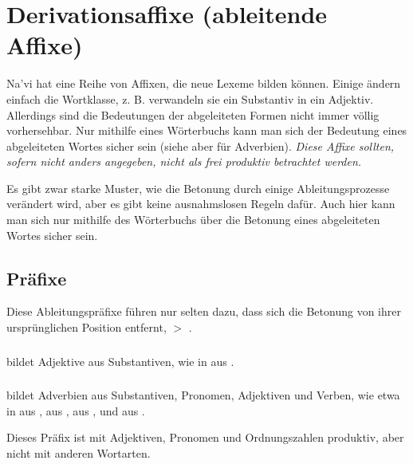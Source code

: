 
\section{Derivationsaffixe (ableitende Affixe)}\label{lingop:affixes}
\noindent Na'vi hat eine Reihe von Affixen, die neue Lexeme bilden können. Einige ändern einfach die Wortklasse, z. B. verwandeln sie ein Substantiv in ein Adjektiv. Allerdings sind die Bedeutungen der abgeleiteten Formen nicht immer völlig vorhersehbar. Nur mithilfe eines Wörterbuchs kann man sich der Bedeutung eines abgeleiteten Wortes sicher sein (siehe aber  für Adverbien). \textit{Diese Affixe sollten, sofern nicht anders angegeben, nicht als frei produktiv betrachtet werden.}

Es gibt zwar starke Muster, wie die Betonung durch einige Ableitungsprozesse verändert wird, aber es gibt keine ausnahmslosen Regeln dafür. Auch hier kann man sich nur mithilfe des Wörterbuchs über die Betonung eines abgeleiteten Wortes sicher sein.

\subsection{Präfixe} Diese Ableitungspräfixe führen nur selten dazu, dass sich die Betonung von ihrer ursprünglichen Position entfernt,   $>$  . 

\subsubsection{}  bildet Adjektive aus Substantiven, wie in   aus  .

\subsubsection{}  bildet Adverbien aus Substantiven, Pronomen, Adjektiven und Verben, wie etwa in   aus ,   aus  ,   aus  , und   aus  . 

Dieses Präfix ist mit Adjektiven, Pronomen und Ordnungszahlen produktiv, aber nicht mit anderen Wortarten.

